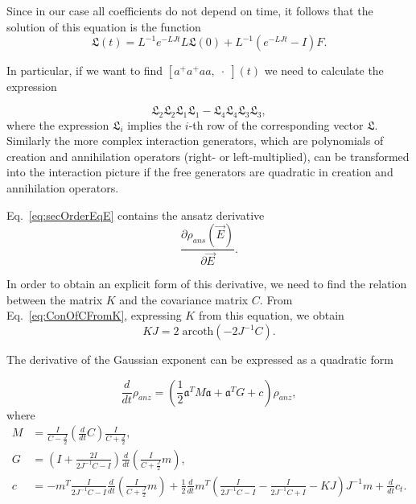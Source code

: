 \documentclass[12pt]{article}
\theoremstyle{definition}
\newcommand\bra{\left<}
\newcommand\ket{\right>}
\newcommand{\braket}[1]{\bra#1\ket}
\newcommand{\mf}[1]{\mathfrak{#1}}
\begin{document}
	Since in our case all coefficients do not depend on time, it follows that the solution of this equation is the function
	\begin{equation}
		\label{eq:SolOfSuper}
		\mathfrak{L}(t) = L^{-1}e^{-LJt}L\mf{L}(0) + L^{-1}(e^{-LJt} - I)F.
	\end{equation}
	
	
	In particular, if we want to find $[a^+a^+aa, \; \cdot \;](t)$ we need to calculate the expression
	
	\begin{equation*}
		\mathfrak{L}_2\mathfrak{L}_2\mathfrak{L}_1\mathfrak{L}_1 - \mathfrak{L}_4\mathfrak{L}_4\mathfrak{L}_3\mathfrak{L}_3,
	\end{equation*}
	where the expression $\mathfrak{L}_i$ implies the $i$-th row of the corresponding vector $\mathfrak{L}$. Similarly the more complex interaction generators, which are polynomials  of creation and annihilation operators (right- or left-multiplied), can be transformed into the interaction picture if the free generators are quadratic in creation and annihilation operators. 
	
	
	
	Eq.~\eqref{eq:secOrderEqE} contains the ansatz derivative
	\begin{equation*}
		 \frac{\partial \rho_{ans}(\vec{E})}{\partial \vec{E}}.
	\end{equation*}
	
	In order to obtain an explicit form of this derivative, we need to find the relation between the matrix $K$ and the covariance matrix $C$. From Eq.~\eqref{eq:ConOfCFromK}, expressing $K$ from this equation, we obtain
	\begin{equation}
		\label{eq:ConOfKFromC}
		KJ = 2\;\text{arcoth}\left(-2J^{-1}C\right).		
	\end{equation}
	
	The derivative of the Gaussian exponent can be expressed as a quadratic form
	
	\begin{equation}
		\label{eq:DerWithLin}
		\frac{d}{dt}\rho_{anz} = (\frac{1}{2}\mf{a}^TM\mf{a} + \mf{a}^TG + c)\rho_{anz},
	\end{equation}
	where
	\begin{align*}
		M &= \frac{I}{C - \frac{J}{2}}\left(\frac{d}{dt}C\right)\frac{I}{C + \frac{J}{2}},\\
		G &= \left(  I + \frac{2I}{2J^{-1}C - I}  \right)\frac{d}{dt}\left(\frac{I}{C + \frac{J}{2}}m\right),\\
		c &=-m^T\frac{I}{2J^{-1}C -  I}\frac{d}{dt}\left(\frac{I}{C + \frac{J}{2}}m\right) + \frac{1}{2}\frac{d}{dt}m^T\left( \frac{I}{2J^{-1}C - I} - \frac{I}{2J^{-1}C + I} - KJ \right)J^{-1}m + \frac{d}{dt}c_t.
	\end{align*}
	
\end{document}
